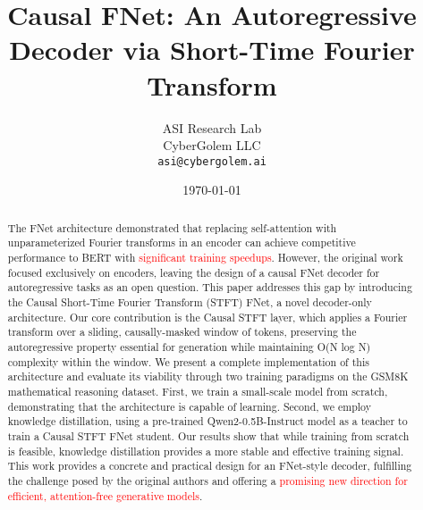 \documentclass[11pt,a4paper]{article}
\title{Causal FNet: An Autoregressive Decoder via Short-Time Fourier Transform}
\author{ASI Research Lab \\
CyberGolem LLC \\
\texttt{asi@cybergolem.ai}}
\date{\today}
\begin{document}
\maketitle
\begin{abstract}
The FNet architecture demonstrated that replacing self-attention with unparameterized Fourier transforms in an encoder can achieve competitive performance to BERT with \textcolor{red}{significant training speedups}. However, the original work focused exclusively on encoders, leaving the design of a causal FNet decoder for autoregressive tasks as an open question. This paper addresses this gap by introducing the Causal Short-Time Fourier Transform (STFT) FNet, a novel decoder-only architecture. Our core contribution is the Causal STFT layer, which applies a Fourier transform over a sliding, causally-masked window of tokens, preserving the autoregressive property essential for generation while maintaining O(N log N) complexity within the window. We present a complete implementation of this architecture and evaluate its viability through two training paradigms on the GSM8K mathematical reasoning dataset. First, we train a small-scale model from scratch, demonstrating that the architecture is capable of learning. Second, we employ knowledge distillation, using a pre-trained Qwen2-0.5B-Instruct model as a teacher to train a Causal STFT FNet student. Our results show that while training from scratch is feasible, knowledge distillation provides a more stable and effective training signal. This work provides a concrete and practical design for an FNet-style decoder, fulfilling the challenge posed by the original authors and offering a \textcolor{red}{promising new direction for efficient, attention-free generative models}.
\end{abstract}
\end{document}

